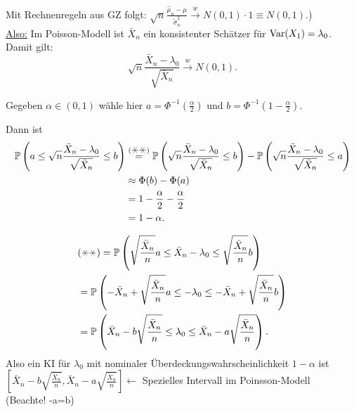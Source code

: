 \documentclass{tstextbook}
\begin{document}
\begin{example}
	Mit Rechnenregeln aus GZ folgt: $ \sqrt{n} \frac{\hat{\mu}_n - \mu}{\tilde{\sigma}_n^2} \xrightarrow{w} N(0,1)\cdot 1 \equiv N(0,1). $)\\
	
	\underline{Also:} Im Poisson-Modell ist $ \bar{X}_n $ ein konsistenter Schätzer für $ \operatorname{Var}(X_1) = \lambda_0 $. 	
	Damit gilt: 
	\[
	\sqrt{n} \frac{\bar{X}_n-\lambda_0}{\sqrt{\bar{X}_n}} \overset{w}{\longrightarrow} N(0,1). \tag{$\hexstar\hexstar$}
	\]
	
	
	Gegeben $ \alpha \in (0,1) $ wähle hier $ a = \Phi^{-1} \left(\frac{\alpha}{2}\right) $ und $ b = \Phi^{-1} \left( 1 - \frac{\alpha}{2} \right) $. 
	
	Dann ist 
	\[
	\begin{aligned}
		\Prob\left(a \le \sqrt{n} \frac{\bar{X}_n - \lambda_0}{\sqrt{\bar{X}_n}} \le b \right) & \overset{(\hexstar\hexstar)}{=} \Prob\left(\sqrt{n} \frac{\bar{X}_n - \lambda_0}{\sqrt{\bar{X}_n}} \le b \right) - \Prob\left(\sqrt{n} \frac{\bar{X}_n - \lambda_0}{\sqrt{\bar{X}_n}} \le a \right) \\
		& \approx \Phi (b) - \Phi (a) \\
		& = 1 - \frac{\alpha}{2} - \frac{\alpha}{2} \\
		& = 1 - \alpha.
	\end{aligned}
	\]
	
	\[
	\begin{aligned}
		&(\hexstar\hexstar) = \Prob \left(\sqrt{\frac{\bar{X}_n}{n}} a \le \bar{X}_n - \lambda_0 \le \sqrt{\frac{\bar{X}_n}{n}} b \right) \\
		& = \Prob \left(- \bar{X}_n + \sqrt{\frac{\bar{X}_n}{n}} a \le  - \lambda_0 \le - \bar{X}_n + \sqrt{\frac{\bar{X}_n}{n}} b \right) \\
		& = \Prob \left(\bar{X}_n - b \sqrt{\frac{\bar{X}_n}{n}}  \le   \lambda_0 \le  \bar{X}_n - a \sqrt{\frac{\bar{X}_n}{n}}  \right).
	\end{aligned}
	\]
	Also ein KI für $ \lambda_0 $ mit nominaler Überdeckungswahrscheinlichkeit $ 1-\alpha $ ist $ \left[\bar{X}_n -b \sqrt{\frac{\bar{X}_n}{n}} , \bar{X}_n - a\sqrt{\frac{\bar{X}_n}{n}}  \right]  \leftarrow $ Spezielles Intervall im Poinsson-Modell   \\
	(Beachte! -a=b)
	
	
\end{example}
\end{document}
